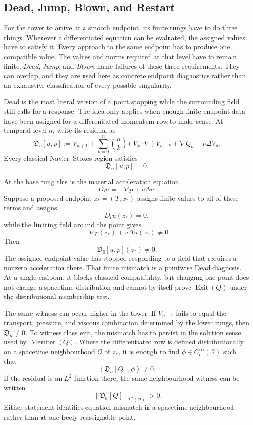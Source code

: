 \subsection{Dead, Jump, Blown, and Restart}\label{sub:DeadJumpBlownAndRestart}

For the tower to arrive at a smooth endpoint, its finite rungs have to do three things.
Whenever a differentiated equation can be evaluated, the assigned values have to satisfy it.
Every approach to the same endpoint has to produce one compatible value.
The values and norms required at that level have to remain finite.
\emph{Dead}, \emph{Jump}, and \emph{Blown} name failures of these three requirements.
They can overlap, and they are used here as concrete endpoint diagnostics rather than an exhaustive classification of every possible singularity.


Dead is the most literal version of a point stopping while the surrounding field still calls for a response.
The idea only applies when enough finite endpoint data have been assigned for a differentiated momentum row to make sense.
At temporal level \(n\), write its residual as
\[
  \mathfrak D_n[u,p]
  :=
  V_{n+1}
  +
  \sum_{k=0}^{n}
  \binom{n}{k}
  (V_k\cdot\nabla)V_{n-k}
  +
  \nabla Q_n
  -
  \nu\Delta V_n.
\]
Every classical Navier--Stokes region satisfies
\[
  \mathfrak D_n[u,p]=0.
\]

At the base rung this is the material acceleration equation
\[
  D_tu=-\nabla p+\nu\Delta u.
\]
Suppose a proposed endpoint \(z_*=(T,x_*)\) assigns finite values to all of these terms and assigns
\[
  D_tu(z_*)=0,
\]
while the limiting field around the point gives
\[
  -\nabla p(z_*)+\nu\Delta u(z_*)\neq0.
\]
Then
\[
  \mathfrak D_0[u,p](z_*)\neq0.
\]
The assigned endpoint value has stopped responding to a field that requires a nonzero acceleration there.
That finite mismatch is a pointwise Dead diagnosis.
At a single endpoint it blocks classical compatibility, but changing one point does not change a spacetime distribution and cannot by itself prove \(\operatorname{Exit}(Q)\) under the distributional membership test.

The same witness can occur higher in the tower.
If \(V_{n+1}\) fails to equal the transport, pressure, and viscous combination determined by the lower rungs, then \(\mathfrak D_n\neq0\).
To witness class exit, the mismatch has to persist in the solution sense used by \(\operatorname{Member}(Q)\).
Where the differentiated row is defined distributionally on a spacetime neighbourhood \(\mathcal O\) of \(z_*\), it is enough to find \(\phi\in C_c^\infty(\mathcal O)\) such that
\[
  \left\langle
    \mathfrak D_n[Q],\phi
  \right\rangle
  \neq0.
\]
If the residual is an \(L^2\) function there, the same neighbourhood witness can be written
\[
  \|\mathfrak D_n[Q]\|_{L^2(\mathcal O)}>0.
\]
Either statement identifies equation mismatch in a spacetime neighbourhood rather than at one freely reassignable point.

